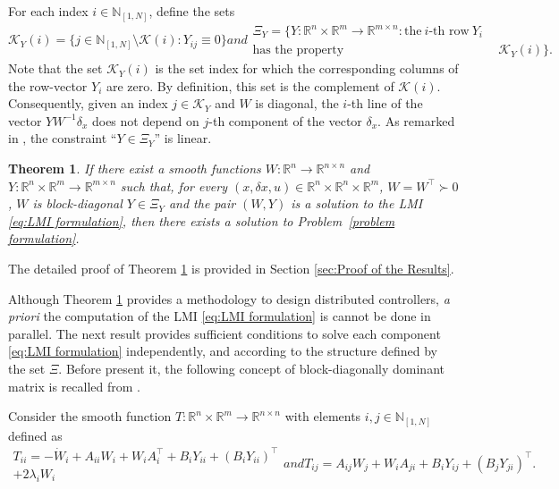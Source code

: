 \documentclass[10pt,twocolumn,twoside]{IEEEtran}
\theoremstyle{plain}
\newtheorem{theorem}{Theorem}
\theoremstyle{definition}
\theoremstyle{remark}
\begin{document}
For each index $i\in\mathbb{N}_{[1,N]}$, define the sets 
\begin{subequations}
	\begin{equation*}
		\mathscr{K}_Y(i)=\{j\in \mathbb{N}_{[1,N]}\setminus\mathscr{K}(i):Y_{ij}\equiv0\}
	\end{equation*}
	and
	\begin{align*}
		\Xi_Y=\{Y:\mathbb{R}^n\times\mathbb{R}^m\to\mathbb{R}^{m\times n}:\text{the}\ i\text{-th row}\ Y_i\ \\
		\text{has the property}&\ \mathscr{K}_Y(i)\}.
	\end{align*}
\end{subequations}
Note that the set $\mathscr{K}_Y(i)$ is the set index for which the corresponding columns of the row-vector $Y_i$ are zero. By definition, this set is the complement of $\mathscr{K}(i)$. Consequently, given an index $j\in\mathscr{K}_Y$ and $W$ is diagonal, the $i$-th line of the vector $YW^{-1}\delta_x$ does not depend on $j$-th component of the vector $\delta_x$. As remarked in \cite{Tanaka2011}, the constraint ``$Y\in\Xi_Y$'' is linear.

\begin{theorem}\label{thm:main result}
	If there exist a smooth functions $W:\mathbb{R}^n\to\mathbb{R}^{n\times n}$ and $Y:\mathbb{R}^n\times\mathbb{R}^m\to\mathbb{R}^{m\times n}$ such that, for every $(x,\delta x,u)\in\mathbb{R}^n\times\mathbb{R}^n\times\mathbb{R}^m$, $W=W^\top\succ0$, $W$ is block-diagonal $Y\in\Xi_Y$ and the pair $(W,Y)$ is a solution to the LMI \eqref{eq:LMI formulation}, then there exists a solution to Problem~\ref{problem formulation}.
\end{theorem}

The detailed proof of Theorem \ref{thm:main result} is provided in Section \ref{sec:Proof of the Results}. 

Although Theorem \ref{thm:main result} provides a methodology to design distributed controllers, \emph{a priori} the computation of the LMI \eqref{eq:LMI formulation} is cannot be done in parallel. The next result provides sufficient conditions to solve each component \eqref{eq:LMI formulation} independently, and according to the structure defined by the set $\Xi$. Before present it, the following concept of block-diagonally dominant matrix is recalled from \cite{ZhangLiChen2006}.

Consider the smooth function $T:\mathbb{R}^n\times\mathbb{R}^m\to\mathbb{R}^{n\times n}$ with elements $i,j\in\mathbb{N}_{[1,N]}$ defined as
	\begin{subequations}\label{eq:T}
	\begin{align}
		T_{ii}=-\dot{W}_i+A_{ii}W_i+W_iA_i^\top+B_iY_{ii}+(B_iY_{ii})^\top\nonumber\\
		+2\lambda_i W_i
	\end{align}
	and
	\begin{equation}
		T_{ij}=A_{ij}W_j+W_iA_{ji}+B_iY_{ij}+(B_jY_{ji})^\top.
	\end{equation}
	\end{subequations}
\end{document}
